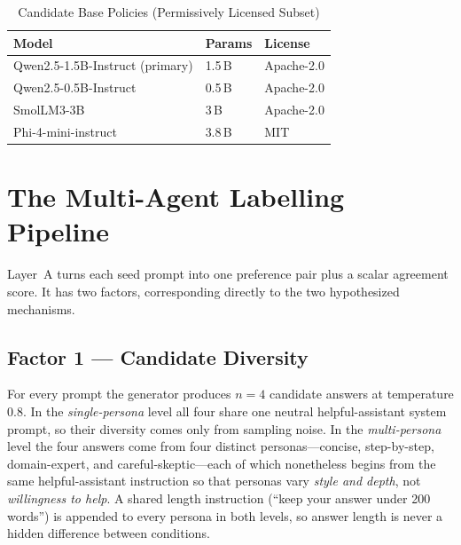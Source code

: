 \documentclass[conference]{IEEEtran}
\begin{document}
\begin{table}[t]
\caption{Candidate Base Policies (Permissively Licensed Subset)}
\label{tab:models}
\centering
\footnotesize
\begin{tabular}{@{}lll@{}}
\toprule
\textbf{Model} & \textbf{Params} & \textbf{License} \\
\midrule
Qwen2.5-1.5B-Instruct (primary) & 1.5\,B & Apache-2.0 \\
Qwen2.5-0.5B-Instruct & 0.5\,B & Apache-2.0 \\
SmolLM3-3B & 3\,B & Apache-2.0 \\
Phi-4-mini-instruct & 3.8\,B & MIT \\
\bottomrule
\end{tabular}
\end{table}

\section{The Multi-Agent Labelling Pipeline}
Layer~A turns each seed prompt into one preference pair plus a scalar agreement
score. It has two factors, corresponding directly to the two hypothesized
mechanisms.

\subsection{Factor 1 --- Candidate Diversity}
For every prompt the generator produces $n=4$ candidate answers at temperature
$0.8$. In the \emph{single-persona} level all four share one neutral
helpful-assistant system prompt, so their diversity comes only from sampling
noise. In the \emph{multi-persona} level the four answers come from four distinct
personas---concise, step-by-step, domain-expert, and careful-skeptic---each of
which nonetheless begins from the same helpful-assistant instruction so that
personas vary \emph{style and depth}, not \emph{willingness to help}. A shared
length instruction (``keep your answer under 200 words'') is appended to every
persona in both levels, so answer length is never a hidden difference between
conditions.
\end{document}
